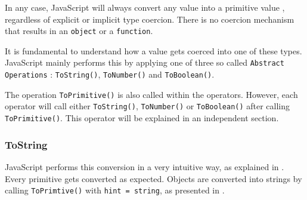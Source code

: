 \begin{code}
	\captionsetup{aboveskip=0pt, belowskip=10pt}
	\caption[Implicit JavaScript Type Coercion]{\textbf{Implicit JavaScript Type Coercion} - Examples given by Douglas Crockford in his talk `JavaScript: The Good Parts' at Google\footnote{https://www.youtube.com/watch?v=hQVTIJBZook}.}
	\label{code:background-implicit-type-coercion}
\end{code}

In any case, JavaScript will always convert any value into a primitive value \citep{ecma-script}, regardless of explicit or implicit type coercion. There is no coercion mechanism that results in an \texttt{object} or a \texttt{function}.

It is fundamental to understand how a value gets coerced into one of these types. JavaScript mainly performs this by applying one of three so called \texttt{Abstract Operations} \citep{ecma-script}: \texttt{ToString()}, \texttt{ToNumber()} and \texttt{ToBoolean()}.

The operation \texttt{ToPrimitive()} is also called within the operators. However, each operator will call either \texttt{ToString()}, \texttt{ToNumber()} or \texttt{ToBoolean()} after calling \texttt{ToPrimitive()}. This operator will be explained in an independent section.

\subsubsection{ToString}
JavaScript performs this conversion in a very intuitive way, as explained in . Every primitive gets converted as expected. Objects are converted into strings by calling \texttt{ToPrimtive()} with \texttt{hint = string}, as presented in .

\begin{code}
	\captionsetup{aboveskip=0pt, belowskip=10pt}
	\caption[ToString implementation]{\textbf{ToString implementation}}
	\label{code:background-to-string-implementation}
\end{code}

\begin{code}
	\captionsetup{aboveskip=0pt, belowskip=10pt}
	\caption[ToString operation]{\textbf{ToString operation}}
	\label{code:background-to-string-operation}
\end{code}

